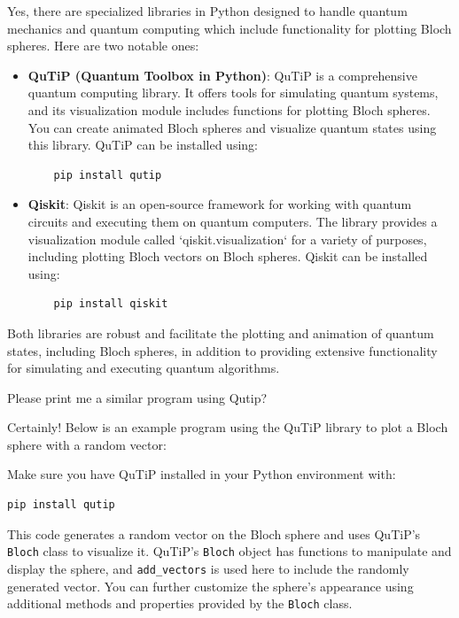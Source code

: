 \begin{airesult}
Yes, there are specialized libraries in Python designed to handle quantum mechanics and quantum
computing which include functionality for plotting Bloch spheres. Here are two notable ones:

\begin{itemize}
  \item \textbf{QuTiP (Quantum Toolbox in Python)}: QuTiP is a comprehensive quantum computing
library. It offers tools for simulating quantum systems, and its visualization module includes
functions for plotting Bloch spheres. You can create animated Bloch spheres and visualize quantum
states using this library.
    \vsp
    QuTiP can be installed using:
    \begin{verbatim}
    pip install qutip
    \end{verbatim}

  \item \textbf{Qiskit}: Qiskit is an open-source framework for working with quantum circuits and
executing them on quantum computers. The library provides a visualization module called
`qiskit.visualization` for a variety of purposes, including plotting Bloch vectors on Bloch spheres.
    \vsp
    Qiskit can be installed using:
    \begin{verbatim}
    pip install qiskit
    \end{verbatim}

  \vsp
\end{itemize}

Both libraries are robust and facilitate the plotting and animation of quantum states, including
Bloch spheres, in addition to providing extensive functionality for simulating and executing quantum
algorithms.
\end{airesult}


\begin{ai}
Please print me a similar program using Qutip?
\end{ai}

\begin{airesult}
Certainly! Below is an example program using the QuTiP library to plot a Bloch sphere with a random
vector:

\vsp

Make sure you have QuTiP installed in your Python environment with:
\begin{verbatim}
pip install qutip
\end{verbatim}

This code generates a random vector on the Bloch sphere and uses QuTiP's \verb|Bloch| class to
visualize
it. QuTiP's \verb|Bloch| object has functions to manipulate and display the sphere, and
\verb|add_vectors| is
used here to include the randomly generated vector. You can further customize the sphere's
appearance using additional methods and properties provided by the \verb|Bloch| class.
\end{airesult}


